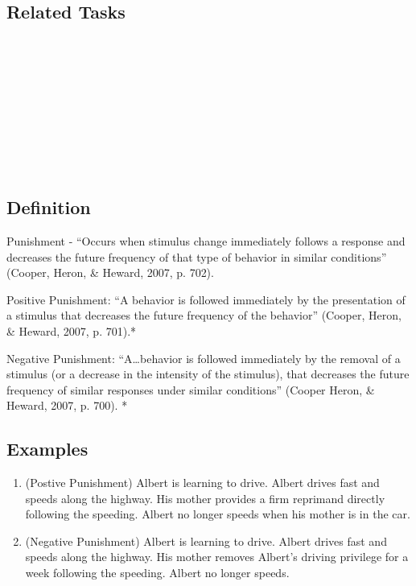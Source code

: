 \subsection{Related Tasks}
\fourdSixteen{}\\
\fourdSeventeen{}\\
\fourjTwo{}\\
\fourjTen{}\\
\fourFKNineteen{}\\
\fourFKTwenty{}\\
\fourFKTwentyOne{}\\
\fourFKTwentyThree{}\\
%
%
%
%
\section{\fourdSixteen{}}
\subsection{Definition}
Punishment - ``Occurs when stimulus change immediately follows a response and decreases the future frequency of that type of behavior in similar conditions'' (Cooper, Heron, \& Heward, 2007, p. 702).

Positive Punishment: ``A behavior is followed immediately by the presentation of a stimulus that decreases the future frequency of the behavior'' (Cooper, Heron, \& Heward, 2007, p. 701).*

Negative Punishment: ``A…behavior is followed immediately by the removal of a stimulus (or a decrease in the intensity of the stimulus), that decreases the future frequency of similar responses under similar conditions'' (Cooper Heron, \& Heward, 2007, p. 700). *

\subsection{Examples}
\begin{enumerate}
\item (Postive Punishment) Albert is learning to drive.  Albert drives fast and speeds along the highway.  His mother provides a firm reprimand directly following the speeding.  Albert no longer speeds when his mother is in the car. 
\item (Negative Punishment) Albert is learning to drive.  Albert drives fast and speeds along the highway.  His mother removes Albert's driving privilege for a week following the speeding.  Albert no longer speeds.
\end{enumerate}
%
